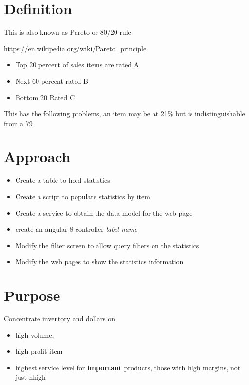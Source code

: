 \documentclass[letterpaper,10pt,english]{sphinxmanual}
\begin{document}
\section{Definition}
\label{Portal/100-ABC:definition}
This is also known as Pareto or 80/20 rule

\href{https://en.wikipedia.org/wiki/Pareto\_principle}{https://en.wikipedia.org/wiki/Pareto\_principle}
\begin{itemize}
\item {} 
Top 20 percent of sales items are rated A

\item {} 
Next 60 percent rated B

\item {} 
Bottom 20 Rated C

\end{itemize}

This has the following problems, an item may be at 21\% but is indistinguishable from a 79


\section{Approach}
\label{Portal/100-ABC:approach}\begin{itemize}
\item {} 
Create a table to hold statistics

\item {} 
Create a script to populate statistics by item

\item {} 
Create a service to obtain the data model for the web page

\item {} 
create an angular 8 controller \emph{label-name}

\item {} 
Modify the filter screen to allow query filters on the statistics

\item {} 
Modify the web pages to show the statistics information

\end{itemize}


\section{Purpose}
\label{Portal/100-ABC:id1}
Concentrate inventory and dollars on
\begin{itemize}
\item {} 
high volume,

\item {} 
high profit item

\item {} 
highest service level for \textbf{important} products, those with high margins, not just hhigh

\end{itemize}
\end{document}

